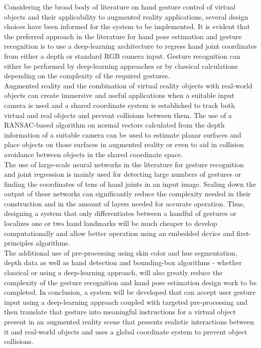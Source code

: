 Considering the broad body of literature on hand gesture control of virtual objects and their applicability to augmented reality applications, several design choices have been informed for the system to be implemented. It is evident that the preferred approach in the literature for hand pose estimation and gesture recognition is to use a deep-learning architecture to regress hand joint coordinates from either a depth or standard RGB camera input. Gesture recognition can either be performed by deep-learning approaches or by classical calculations depending on the complexity of the required gestures.\\

Augmented reality and the combination of virtual reality objects with real-world objects can create immersive and useful applications when a suitable input camera is used and a shared coordinate system is established to track both virtual and real objects and prevent collisions between them. The use of a RANSAC-based algorithm on normal vectors calculated from the depth information of a suitable camera can be used to estimate planar surfaces and place objects on those surfaces in augmented reality or even to aid in collision avoidance between objects in the shared coordinate space. \\

The use of large-scale neural networks in the literature for gesture recognition and joint regression is mainly used for detecting large numbers of gestures or finding the coordinates of tens of hand joints in an input image. Scaling down the output of these networks can significantly reduce the complexity needed in their construction and in the amount of layers needed for accurate operation. Thus, designing a system that only differentiates between a handful of gestures or localizes one or two hand landmarks will be much cheaper to develop computationally and allow better operation using an embedded device and first-principles algorithms. \\

The additional use of pre-processing using skin color and hue segmentation, depth data as well as hand detection and bounding-box algorithms - whether classical or using a deep-learning approach, will also greatly reduce the complexity of the gesture recognition and hand pose estimation design work to be completed. In conclusion, a system will be developed that can accept user gesture input using a deep-learning approach coupled with targeted pre-processing and then translate that gesture into meaningful instructions for a virtual object present in an augmented reality scene that presents realistic interactions between it and real-world objects and uses a global coordinate system to prevent object collisions. \\

